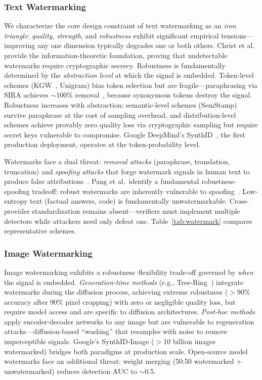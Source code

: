 \subsubsection{Text Watermarking}
\label{sec:wm-text}

We characterize the core design constraint of text watermarking as an \emph{iron triangle}: \emph{quality}, \emph{strength}, and \emph{robustness} exhibit significant empirical tensions---improving any one dimension typically degrades one or both others. Christ et al.~\cite{christ2024undetectable} provide the information-theoretic foundation, proving that undetectable watermarks require cryptographic secrecy. Robustness is fundamentally determined by the \emph{abstraction level} at which the signal is embedded. Token-level schemes (KGW~\cite{kirchenbauer2023kgw}, Unigram) bias token selection but are fragile---paraphrasing via SIRA achieves $\sim$100\% removal~\cite{cheng2025sira}, because synonymous tokens destroy the signal. Robustness increases with abstraction: semantic-level schemes (SemStamp) survive paraphrase at the cost of sampling overhead, and distribution-level schemes achieve provably zero quality loss via cryptographic sampling but require secret keys vulnerable to compromise. Google DeepMind's SynthID~\cite{synthidtext2024}, the first production deployment, operates at the token-probability level.

Watermarks face a dual threat: \emph{removal attacks} (paraphrase, translation, truncation) and \emph{spoofing attacks} that forge watermark signals in human text to produce false attributions~\cite{sadasivan2023spoofing}. Pang et al.\ identify a fundamental robustness-spoofing tradeoff: robust watermarks are inherently vulnerable to spoofing~\cite{pang2024nofree}. Low-entropy text (factual answers, code) is fundamentally unwatermarkable. Cross-provider standardization remains absent---verifiers must implement multiple detectors while attackers need only defeat one. Table~\ref{tab:watermark} compares representative schemes.

\subsubsection{Image Watermarking}
\label{sec:wm-image}

Image watermarking exhibits a robustness--flexibility trade-off governed by \emph{when} the signal is embedded. \emph{Generation-time methods} (e.g., Tree-Ring~\cite{wen2023treering}) integrate watermarks during the diffusion process, achieving extreme robustness ($>$90\% accuracy after 90\% pixel cropping) with zero or negligible quality loss, but require model access and are specific to diffusion architectures. \emph{Post-hoc methods} apply encoder-decoder networks to any image but are vulnerable to regeneration attacks---diffusion-based ``washing'' that resamples with noise to remove imperceptible signals. Google's SynthID-Image ($>$10 billion images watermarked) bridges both paradigms at production scale. Open-source model watermarks face an additional threat: weight merging (50:50 watermarked + unwatermarked) reduces detection AUC to $\sim$0.5.

